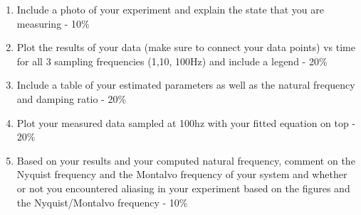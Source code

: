 

\begin{enumerate}[itemsep=-5pt]
\item Include a photo of your experiment and explain the state that you are measuring - 10\%
\item Plot the results of your data (make sure to connect your data points) vs time for all 3 sampling frequencies (1,10, 100Hz) and include a legend - 20\%
\item Include a table of your estimated parameters as well as the natural frequency and damping ratio - 20\% 
\item Plot your measured data sampled at 100hz with your fitted equation on top - 20\%
\item Based on your results and your computed natural frequency, comment on the Nyquist frequency and the Montalvo frequency of your system and whether or not you encountered aliasing in your experiment based on the figures and the Nyquist/Montalvo frequency - 10\%
\end{enumerate}
